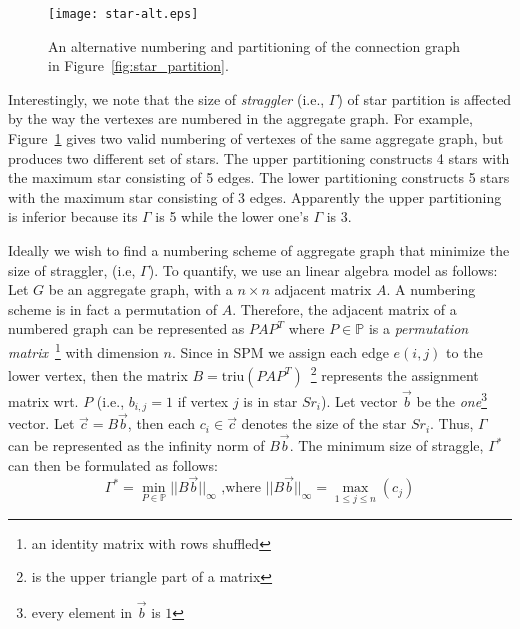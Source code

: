 

\begin{figure}[h]
\centering
\texttt{[image: star-alt.eps]}
\caption{An alternative numbering and partitioning of the connection graph in Figure~\ref{fig:star_partition}.}
\label{fig:star-alt}
\end{figure}

Interestingly, we note that the size of \emph{straggler} (i.e., $\Gamma$) 
of star partition is affected by
the way the vertexes are numbered in the aggregate graph. For example,
Figure~\ref{fig:star-alt} gives two valid numbering of vertexes 
of the same aggregate graph, but produces two different set of stars. 
The upper partitioning constructs 4 stars with the maximum star consisting of 5 edges.
The lower partitioning constructs 5 stars with the maximum star consisting of 3 edges.
Apparently the upper partitioning is inferior because its $\Gamma$ is 5 while the
lower one's $\Gamma$ is 3.

Ideally we wish to find a numbering scheme of aggregate graph
that minimize the size of straggler, (i.e, $\Gamma$).
To quantify, we use an linear algebra model as follows: 
Let $G$ be an aggregate graph, with a $n \times n$ adjacent matrix $A$.
A numbering scheme is in fact a permutation of $A$. Therefore,
the adjacent matrix of a numbered graph can be represented as $PAP^T$
where $P \in \mathbb{P}$ is a 
\emph{permutation matrix}~\footnote{an identity matrix with rows shuffled} with dimension $n$.
Since in SPM we assign each edge $e(i,j)$ to the lower vertex, 
then the matrix $B=\text{triu}(PAP^T)$~\footnote{ is the upper triangle part of a matrix}
represents the assignment matrix wrt. $P$ (i.e., $b_{i,j} = 1$ if vertex $j$ is in star $Sr_i$).
Let vector $\vec{b}$ be the \textit{one}\footnote{every element in $\vec{b}$ is $1$} 
vector. Let $\vec{c} = B\vec{b}$, then each $c_i \in \vec{c}$ 
denotes the size of the star $Sr_i$. Thus, $\Gamma$ can be represented
as the infinity norm of $B\vec{b}$. The minimum size of straggle, $\Gamma^*$
can then be formulated as follows:
\begin{equation}
\Gamma^* = \min_{P \in \mathbb{P}}{||B\vec{b}||_\infty} \text{ ,where } ||B\vec{b}||_\infty = \max_{1\leq j \leq n}(c_j)
\end{equation}

